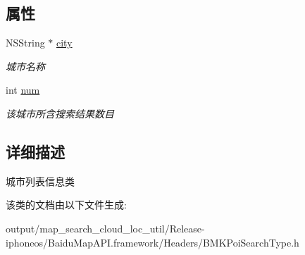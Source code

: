 \subsection*{属性}
\begin{DoxyCompactItemize}
\item 
\hypertarget{interface_b_m_k_city_list_info_ad1b2093344ad0524a9bef93c823f8242}{}N\+S\+String $\ast$ \hyperlink{interface_b_m_k_city_list_info_ad1b2093344ad0524a9bef93c823f8242}{city}\label{interface_b_m_k_city_list_info_ad1b2093344ad0524a9bef93c823f8242}

\begin{DoxyCompactList}\small\item\em 城市名称 \end{DoxyCompactList}\item 
\hypertarget{interface_b_m_k_city_list_info_a63163c524339e1687d90541b3a24b54c}{}int \hyperlink{interface_b_m_k_city_list_info_a63163c524339e1687d90541b3a24b54c}{num}\label{interface_b_m_k_city_list_info_a63163c524339e1687d90541b3a24b54c}

\begin{DoxyCompactList}\small\item\em 该城市所含搜索结果数目 \end{DoxyCompactList}\end{DoxyCompactItemize}


\subsection{详细描述}
城市列表信息类 

该类的文档由以下文件生成\+:\begin{DoxyCompactItemize}
\item 
output/map\+\_\+search\+\_\+cloud\+\_\+loc\+\_\+util/\+Release-\/iphoneos/\+Baidu\+Map\+A\+P\+I.\+framework/\+Headers/B\+M\+K\+Poi\+Search\+Type.\+h\end{DoxyCompactItemize}
